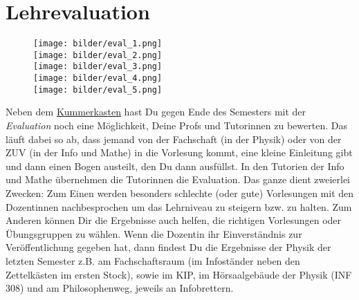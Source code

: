 \section{Lehrevaluation}
\label{eval}

\begin{figure}[b]
\centering
        \texttt{[image: bilder/eval\_1.png]}\\
        \texttt{[image: bilder/eval\_2.png]}\\
        \texttt{[image: bilder/eval\_3.png]}\\
        \texttt{[image: bilder/eval\_4.png]}\\
        \texttt{[image: bilder/eval\_5.png]}\\
\end{figure}

\noindent Neben dem \hyperref[kummerkasten]{Kummerkasten} hast Du gegen Ende des Semesters mit der \emph{Evaluation} noch eine Möglichkeit, Deine Profs und Tutorinnen zu bewerten. Das läuft dabei so ab, dass jemand von der Fachschaft (in der Physik) oder von der ZUV (in der Info und Mathe) in die Vorlesung kommt, eine kleine Einleitung gibt und dann einen Bogen austeilt, den Du dann ausfüllst. In den Tutorien der Info und Mathe übernehmen die Tutorinnen die Evaluation. Das ganze dient zweierlei Zwecken: Zum Einen werden besonders schlechte (oder gute) Vorlesungen mit den Dozentinnen nachbesprochen um das Lehrniveau zu steigern bzw. zu halten. Zum Anderen können Dir die Ergebnisse auch helfen, die richtigen Vorlesungen oder Übungsgruppen zu wählen. Wenn die Dozentin ihr Einverständnis zur Veröffentlichung gegeben hat, dann findest Du die Ergebnisse der Physik der letzten Semester z.B. am Fachschaftsraum (im Infoständer neben den Zettelkästen im ersten Stock), sowie im \gls{KIP}, im Hörsaalgebäude der Physik (\Gls{INF} 308) und am Philosophenweg, jeweils an Infobrettern.
